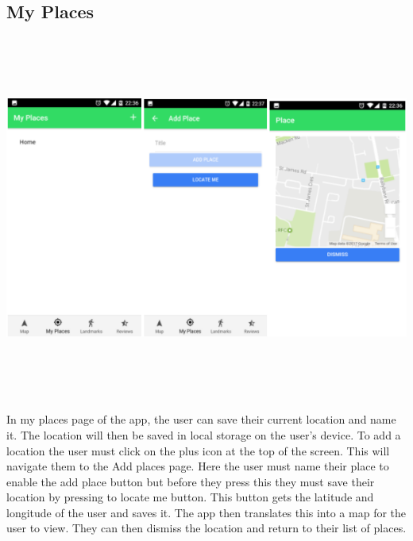 \subsection{My Places}
\begin{center}    
	\includegraphics[width=17cm, height=12cm]{img/myplaces.png}
\end{center}

In my places page of the app, the user can save their current location and name it. The location will then be saved in local storage on the user's device. To add a location the user must click on the plus icon at the top of the screen. This will navigate them to the Add places page. Here the user must name their place to enable the add place button but before they press this they must save their location by pressing to locate me button. This button gets the latitude and longitude of the user and saves it. The app then translates this into a map for the user to view. They can then dismiss the location and return to their list of places.

